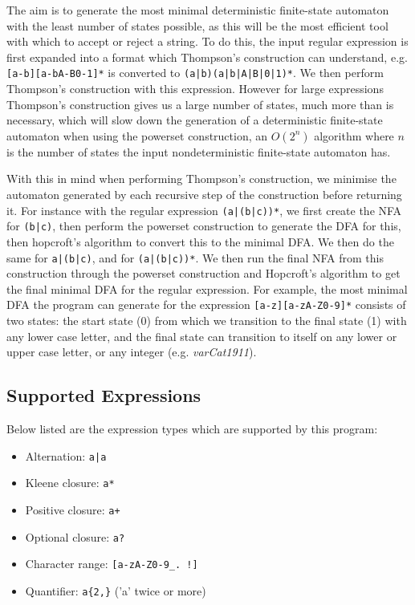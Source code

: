 \documentclass[a4paper, 11pt]{article}
\begin{document}
The aim is to generate the most minimal deterministic finite-state automaton with the least number of states possible, as this will be the most efficient tool with which to accept or reject a string. To do this, the input regular expression is first expanded into a format which Thompson's construction can understand, e.g. \texttt{[a-b][a-bA-B0-1]*} is converted to \texttt{(a|b)(a|b|A|B|0|1)*}. We then perform Thompson's construction with this expression. However for large expressions Thompson's construction gives us a large number of states, much more than is necessary, which will slow down the generation of a deterministic finite-state automaton when using the powerset construction, an $O(2^n)$ algorithm where $n$ is the number of states the input nondeterministic finite-state automaton has.

With this in mind when performing Thompson's construction, we minimise the automaton generated by each recursive step of the construction before returning it. For instance with the regular expression \texttt{(a|(b|c))*}, we first create the NFA for \texttt{(b|c)}, then perform the powerset construction to generate the DFA for this, then hopcroft's algorithm to convert this to the minimal DFA. We then do the same for \texttt{a|(b|c)}, and for \texttt{(a|(b|c))*}. We then run the final NFA from this construction through the powerset construction and Hopcroft's algorithm to get the final minimal DFA for the regular expression. For example, the most minimal DFA the program can generate for the expression \texttt{[a-z][a-zA-Z0-9]*} consists of two states: the start state (0) from which we transition to the final state (1) with any lower case letter, and the final state can transition to itself on any lower or upper case letter, or any integer (e.g. \textit{varCat1911}).

\subsection{Supported Expressions}
Below listed are the expression types which are supported by this program:
\begin{itemize}
\item{Alternation: \texttt{a|a}}
\item{Kleene closure: \texttt{a*}}
\item{Positive closure: \texttt{a+}}
\item{Optional closure: \texttt{a?}}
\item{Character range: \texttt{[a-zA-Z0-9\_.~!]}}
\item{Quantifier: \texttt{a\{2,\}} ('a' twice or more)}
\end{itemize}
\end{document}
